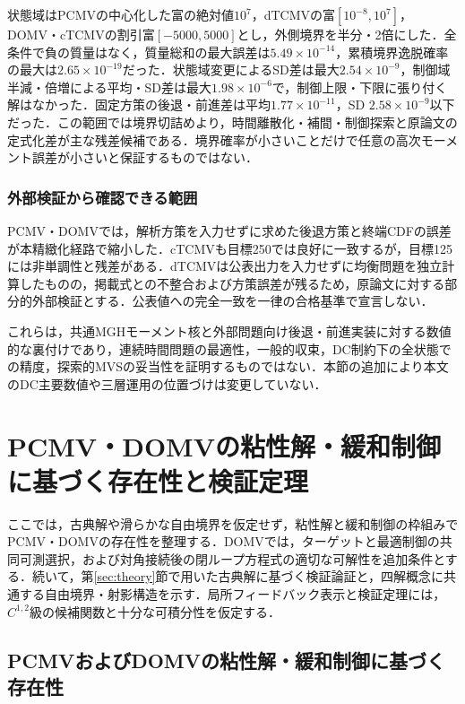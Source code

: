 \documentclass[10pt,a4paper]{article}
\theoremstyle{plain}
\theoremstyle{definition}
\begin{document}
状態域はPCMVの中心化した富の絶対値$10^7$，dTCMVの富$[10^{-8},10^7]$，DOMV・cTCMVの割引富$[-5000,5000]$とし，外側境界を半分・2倍にした．全条件で負の質量はなく，質量総和の最大誤差は$5.49\times10^{-14}$，累積境界逸脱確率の最大は$2.65\times10^{-19}$だった．状態域変更によるSD差は最大$2.54\times10^{-9}$，制御域半減・倍増による平均・SD差は最大$1.98\times10^{-6}$で，制御上限・下限に張り付く解はなかった．固定方策の後退・前進差は平均$1.77\times10^{-11}$，SD $2.58\times10^{-9}$以下だった．この範囲では境界切詰めより，時間離散化・補間・制御探索と原論文の定式化差が主な残差候補である．境界確率が小さいことだけで任意の高次モーメント誤差が小さいと保証するものではない．

\subsubsection{外部検証から確認できる範囲}

PCMV・DOMVでは，解析方策を入力せずに求めた後退方策と終端CDFの誤差が本精緻化経路で縮小した．cTCMVも目標250では良好に一致するが，目標125には非単調性と残差がある．dTCMVは公表出力を入力せずに均衡問題を独立計算したものの，掲載式との不整合および方策誤差が残るため，原論文に対する部分的外部検証とする．公表値への完全一致を一律の合格基準で宣言しない．

これらは，共通MGHモーメント核と外部問題向け後退・前進実装に対する数値的な裏付けであり，連続時間問題の最適性，一般的収束，DC制約下の全状態での精度，探索的MVSの妥当性を証明するものではない．本節の追加により本文のDC主要数値や三層運用の位置づけは変更していない．

\section{PCMV・DOMVの粘性解・緩和制御に基づく存在性と検証定理}
\label{app:technical-proofs}
ここでは，古典解や滑らかな自由境界を仮定せず，粘性解と緩和制御の枠組みでPCMV・DOMVの存在性を整理する．DOMVでは，ターゲットと最適制御の共同可測選択，および対角接続後の閉ループ方程式の適切な可解性を追加条件とする．続いて，第\ref{sec:theory}節で用いた古典解に基づく検証論証と，四解概念に共通する自由境界・射影構造を示す．局所フィードバック表示と検証定理には，$C^{1,2}$級の候補関数と十分な可積分性を仮定する．

\subsection{PCMVおよびDOMVの粘性解・緩和制御に基づく存在性}
\label{app:pcmv-domv-existence}
\end{document}
